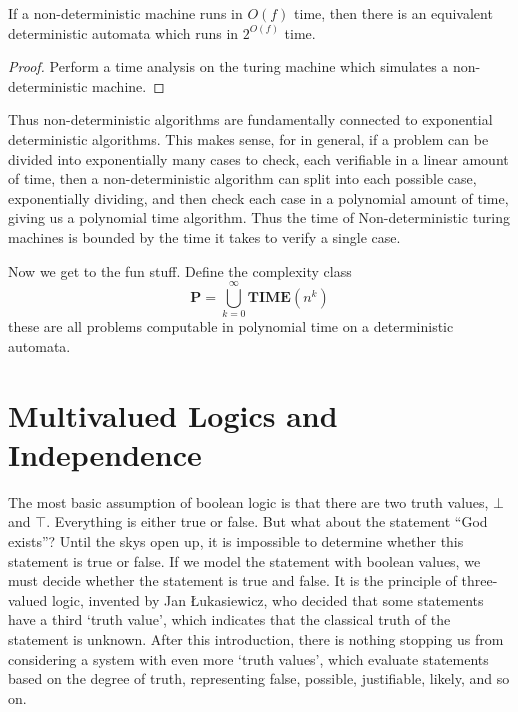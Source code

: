 \begin{theorem}
    If a non-deterministic machine runs in $O(f)$ time, then there is an equivalent deterministic automata which runs in $2^{O(f)}$ time.
\end{theorem}
\begin{proof}
    Perform a time analysis on the turing machine which simulates a non-deterministic machine.
\end{proof}

Thus non-deterministic algorithms are fundamentally connected to exponential deterministic algorithms. This makes sense, for in general, if a problem can be divided into exponentially many cases to check, each verifiable in a linear amount of time, then a non-deterministic algorithm can split into each possible case, exponentially dividing, and then check each case in a polynomial amount of time, giving us a polynomial time algorithm. Thus the time of Non-deterministic turing machines is bounded by the time it takes to verify a single case.

Now we get to the fun stuff. Define the complexity class
%
\[ \textbf{P} = \bigcup_{k = 0}^\infty \textbf{TIME}(n^k) \]
%
these are all problems computable in polynomial time on a deterministic automata.



\section{Multivalued Logics and Independence}

The most basic assumption of boolean logic is that there are two truth values, $\bot$ and $\top$. Everything is either true or false. But what about the statement ``God exists''? Until the skys open up, it is impossible to determine whether this statement is true or false. If we model the statement with boolean values, we must decide whether the statement is true and false. It is the principle of three-valued logic, invented by Jan \L ukasiewicz, who decided that some statements have a third `truth value', which indicates that the classical truth of the statement is unknown. After this introduction, there is nothing stopping us from considering a system with even more `truth values', which evaluate statements based on the degree of truth, representing false, possible, justifiable, likely, and so on.

